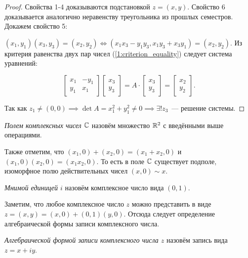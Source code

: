 \begin{proof}
Свойства 1-4 доказываются подстановкой \(z = (x, y)\). Свойство 6 доказывается аналогично 
неравенству треугольника из прошлых семестров. Докажем свойство 5:

\((x_1, y_1) (x_3, y_3) = (x_2, y_2) \iff (x_1 x_3 - y_1 y_3, x_1 y_3 + x_3 y_1) = (x_2, y_2)\). Из
критерия равенства двух пар чисел (\ref{1:criterion_equality}) следует система уравнений:

\[
    \begin{bmatrix}
        x_1 & -y_1 \\
        y_1 & x_1
    \end{bmatrix}
    \begin{bmatrix}
        x_3 \\
        y_3
    \end{bmatrix}
    =
    A \cdot
    \begin{bmatrix}
        x_3 \\
        y_3
    \end{bmatrix}
    =
    \begin{bmatrix}
        x_2 \\
        y_2
    \end{bmatrix}.\]

Так как \(z_1 \neq (0, 0) \implies \det{A} = x_1^2 + y_1^2 \neq 0 \implies \exists! z_3\)~---
решение системы.
\end{proof}

\begin{definition}
\textit{Полем комплексных чисел \(\mathbb{C}\)} назовём множество \(\mathbb{R}^2\) с введёнными выше операциями.
\end{definition}

Также отметим, что \((x_1, 0) + (x_2, 0) = (x_1 + x_2, 0)\) и \((x_1, 0) (x_2, 0) = (x_1 x_2, 0)\).
То есть в поле \(\mathbb{C}\) существует подполе, изоморфное полю действительных чисел \((x, 0) \sim x\).

\begin{definition}
\textit{Мнимой единицей \(i\)} назовём комплексное число вида \((0, 1)\).
\end{definition}

Заметим, что любое комплексное число \(z\) можно представить в виде \(z = (x, y) = (x, 0) + (0, 1)
(y, 0)\). Отсюда следует определение алгебраической формы записи комплексного числа.

\begin{definition}
\textit{Алгебраической формой записи комплексного числа \(z\)} назовём запись вида \(z = x + i y\).
\end{definition}


